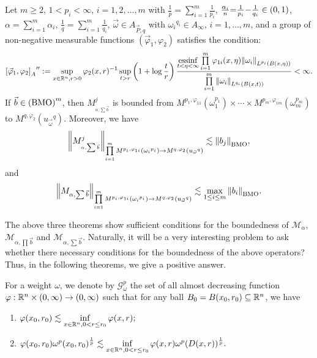 \documentclass[11pt, twoside, leqno]{article}
\begin{document}
\begin{thm}\label{CFRM2}
	Let $m\geq 2$, $1< p_i<\infty$, $i=1,2,\ldots,m$ with $\frac{1}{p} = \sum\limits_{i = 1}^m {\frac{1}{{{p_i}}}}$,  $\frac{{{\alpha _i}}}{n}{\rm{ = }}\frac{1}{{{p_i}}}{\rm{ - }}\frac{1}{{{q_i}}} \in (0,1)$, $\alpha  = \sum\limits_{i = 1}^m {{\alpha _i}}$, $\frac{1}{q} = \sum\limits_{i = 1}^m {\frac{1}{{{q_i}}}}$, $\vec{\omega}\in {A_{\vec P,q}}$ with ${\omega _i}^{{q_i}} \in {A_\infty }$, $i = 1, \ldots ,m$, and a group of non-negative measurable functions $({{\vec \varphi }_1},{\varphi _2})$ satisfies the condition:
	\begin{equation}\label{con7}
	{\left[ {{{\vec \varphi }_1},{\varphi _2}} \right]_A}^{\prime \prime }: = \mathop {\sup }\limits_{x \in {{\mathbb R^n}},r > 0} {\varphi _2}{(x,r)^{{\rm{ - }}1}}\mathop {\sup }\limits_{t > r} \left( {1 + \log \frac{t}{r}} \right)\frac{{\mathop {{\rm{essinf}}}\limits_{t < \eta  < \infty } \prod\limits_{i = 1}^m {{\varphi _{1i}}(x,\eta ){{\left\| {{\omega _i}} \right\|}_{{L^{{p_i}}}(B(x,\eta ))}}} }}{{\prod\limits_{i = 1}^m {{{\left\| {{\omega _i}} \right\|}_{{L^{{q_i}}}(B(x,t))}}} }} < \infty.
	\end{equation}
	If $\vec b \in {\left( {\rm BMO} \right)^m}$, then ${M_{_{\alpha ,\sum {\vec b} }}^j}$ is bounded from ${M^{{p_1},{\varphi _{11}}}}(\omega _1^{{p_1}}) \times  \cdots  \times {M^{{p_m},{\varphi _{1m}}}}(\omega _m^{{p_m}})$ to ${M^{q,{\varphi _2}}}({u_{\vec \omega }}^q)$. Moreover, we have 
	$${\left\| {M_{_{\alpha ,\sum {\vec b} }}^j} \right\|_{\prod\limits_{i = 1}^m {{M^{{p_i},{\varphi _{1i}}}}\left( {{\omega _i}^{{p_i}}} \right)}  \to {M^{q,{\varphi _2}}}\left( {{u_{\vec \omega }}^q} \right)}} \lesssim {\left\| {{b_j}} \right\|_{\rm BMO}},$$ and 
	$${\left\| {{M_{\alpha ,\sum {\vec b} }}} \right\|_{\prod\limits_{i = 1}^m {{M^{{p_i},{\varphi _{1i}}}}\left( {{\omega _i}^{{p_i}}} \right)}  \to {M^{q,{\varphi _2}}}\left( {{u_{\vec \omega }}^q} \right)}} \lesssim \mathop {\max }\limits_{1 \le i \le m} {\left\| {{b_i}} \right\|_{\rm BMO}}.$$
\end{thm}

The above three theorems show sufficient conditions for the boundedness of $\mathcal{M}_\alpha$, ${\mathcal{M}_{\alpha, \prod \vec b }}$ and ${{\mathcal M}_{\alpha ,\sum {\vec b} }}$. Naturally, it will be a very interesting problem to ask whether  there necessary conditions for the boundedness of the above operators? Thus, in the following theorems, we give a positive answer.

For a weight $\omega$, we denote by $\mathcal{G}_\omega ^p$ the set of all almost decreasing function $\varphi :{\mathbb R^n} \times (0,\infty ) \to (0,\infty )$ such that for any ball ${B_0} = B({x_0},{r_0}) \subseteq {\mathbb R^n}$, we have
\begin{enumerate}
	\item[\emph{(1)}]
	$\varphi ({x_0},{r_0}) \lesssim \mathop {\inf }\limits_{x \in {\mathbb R^n},0 < r \le {r_0}} \varphi (x,r);$
	\item[\emph{(2)}]
	$\varphi ({x_0},{r_0}){\omega ^p}{({x_0},{r_0})^{\frac{1}{p}}} \lesssim \mathop {\inf }\limits_{x \in {\mathbb R^n},0 < r \le {r_0}} \varphi (x,r){\omega ^p}{(D(x,r))^{\frac{1}{p}}}.$
\end{enumerate}
\end{document}

